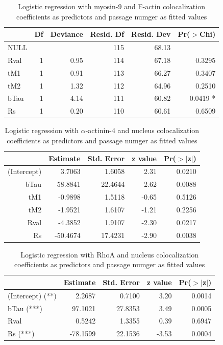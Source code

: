 \documentclass[english,authoryear]{elsarticle}
\begin{document}

\begin{table}[ht]
  \caption{Logistic regression with myosin-9 and F-actin colocalization coefficients as predictors and passage numger as fitted values}
  \label{glm-M9-Fact}
\centering
\begin{tabular}{lrrrrr}
  \hline
 & Df & Deviance & Resid. Df & Resid. Dev & Pr($>$Chi) \\
  \hline
NULL &  &  & 115 & 68.13 &  \\
  Rval & 1 & 0.95 & 114 & 67.18 & 0.3295 \\
  tM1 & 1 & 0.91 & 113 & 66.27 & 0.3407 \\
  tM2 & 1 & 1.32 & 112 & 64.96 & 0.2510 \\
  bTau & 1 & 4.14 & 111 & 60.82 & 0.0419 * \\
  Rs & 1 & 0.20 & 110 & 60.61 & 0.6509 \\
   \hline
\end{tabular}
\end{table}


\begin{table}[ht]
  \caption{Logistic regression with $\alpha$-actinin-4 and nucleus colocalization coefficients as predictors and passage numger as fitted values}
  \label{glm-aA4-nuc}
\centering
\begin{tabular}{rrrrr}
  \hline
 & Estimate & Std. Error & z value & Pr($>$$|$z$|$) \\
  \hline
(Intercept) & 3.7063 & 1.6058 & 2.31 & 0.0210 \\
  bTau & 58.8841 & 22.4644 & 2.62 & 0.0088 \\
  tM1 & -0.9898 & 1.5118 & -0.65 & 0.5126 \\
  tM2 & -1.9521 & 1.6107 & -1.21 & 0.2256 \\
  Rval & -4.3852 & 1.9107 & -2.30 & 0.0217 \\
  Rs & -50.4674 & 17.4231 & -2.90 & 0.0038 \\
   \hline
\end{tabular}
\end{table}

\begin{table}[hb]
  \caption{Logistic regression with RhoA and nucleus colocalization coefficients as predictors and passage numger as fitted values}
  \label{glm-RhoA-nuc}
\centering
\begin{tabular}{l|rrrr}
  \hline
 & Estimate & Std. Error & z value & Pr($>$$|$z$|$) \\
  \hline
(Intercept) (**) & 2.2687 & 0.7100 & 3.20 & 0.0014 \\
  bTau (***) & 97.1021 & 27.8353 & 3.49 & 0.0005 \\
  Rval & 0.5242 & 1.3355 & 0.39 & 0.6947 \\
  Rs (***) & -78.1599 & 22.1536 & -3.53 & 0.0004 \\
   \hline
\end{tabular}
\end{table}
\end{document}
